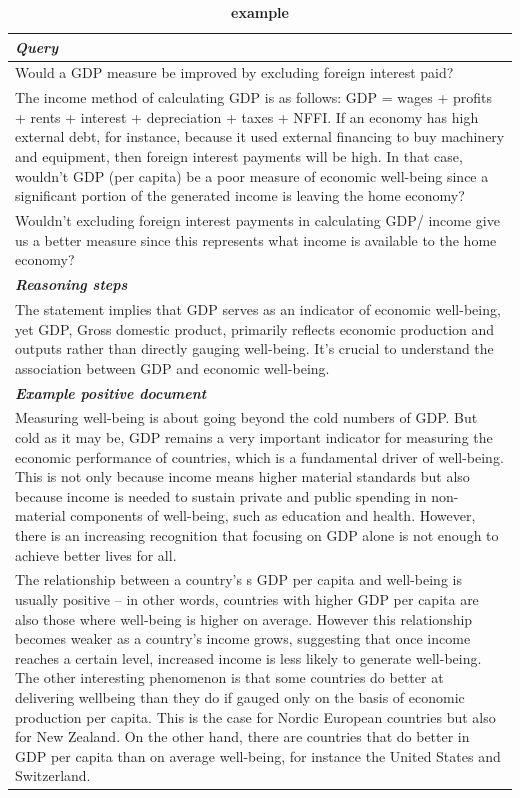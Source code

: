 \begin{table}[ht]
\caption{\textbf{\econ example}}
\centering
\begin{tabular}{p{13cm}}
\toprule
\textit{\textbf{Query}} \\
\midrule
Would a GDP measure be improved by excluding foreign interest paid? \\
The income method of calculating GDP is as follows: GDP = wages + profits + rents + interest + depreciation + taxes + NFFI. If an economy has high external debt, for instance, because it used external financing to buy machinery and equipment, then foreign interest payments will be high. In that case, wouldn't GDP (per capita) be a poor measure of economic well-being since a significant portion of the generated income is leaving the home economy? \\
Wouldn't excluding foreign interest payments in calculating GDP/ income give us a better measure since this represents what income is available to the home economy? \\
\midrule
\textit{\textbf{Reasoning steps}} \\
\midrule
The statement implies that GDP serves as an indicator of economic well-being, yet GDP, Gross domestic product,  primarily reflects economic production and outputs rather than directly gauging well-being. It's crucial to understand the association between GDP and economic well-being. \\
\midrule
\textit{\textbf{Example positive document}} \\
\midrule
Measuring well-being is about going beyond the cold numbers of GDP. But cold as it may be, GDP remains a very important indicator for measuring the economic performance of countries, which is a fundamental driver of well-being. This is not only because income means higher material standards but also because income is needed to sustain private and public spending in non-material components of well-being, such as education and health. However, there is an increasing recognition that focusing on GDP alone is not enough to achieve better lives for all. \\
The relationship between a country’s s GDP per capita and well-being is usually positive – in other words, countries with higher GDP per capita are also those where well-being is higher on average. However this relationship becomes weaker as a country’s income grows, suggesting that once income reaches a certain level, increased income is less likely to generate well-being. The other interesting phenomenon is that some countries do better at delivering wellbeing than they do if gauged only on the basis of economic production per capita. This is the case for Nordic European countries but also for New Zealand. On the other hand,  there are countries that do better in GDP per capita than on average well-being,  for instance the United States and Switzerland. \\

\end{tabular}
\end{table}
